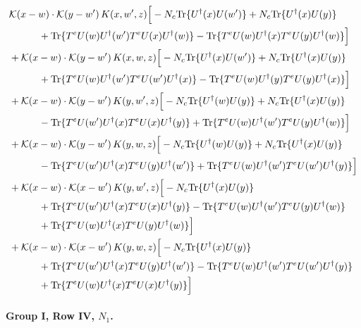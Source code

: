 \documentclass[10pt]{article}
\numberwithin{equation}{section}
\begin{document}
\begin{align}
&\mathcal K(x-w)\cdot\mathcal K(y-w')\,K(x,w',z)\Big[-N_c{\rm Tr}\{U^\dagger(x)U(w')\}+N_c{\rm Tr}\{U^\dagger(x)U(y)\}\notag\\
&\quad\quad\quad+{\rm Tr}\{T^eU(w)U^\dagger(w')T^eU(x)U^\dagger(w)\}-{\rm Tr}\{T^eU(w)U^\dagger(x)T^eU(y)U^\dagger(w)\}\Big]\notag\\
&+\mathcal K(x-w)\cdot\mathcal K(y-w')\,K(x,w,z)\Big[-N_c{\rm Tr}\{U^\dagger(x)U(w')\}+N_c{\rm Tr}\{U^\dagger(x)U(y)\}\notag\\
&\quad\quad\quad+{\rm Tr}\{T^eU(w)U^\dagger(w')T^eU(w')U^\dagger(x)\}-{\rm Tr}\{T^eU(w)U^\dagger(y)T^eU(y)U^\dagger(x)\}\Big]\notag\\
&+\mathcal K(x-w)\cdot\mathcal K(y-w')\,K(y,w',z)\Big[-N_c{\rm Tr}\{U^\dagger(w)U(y)\}+N_c{\rm Tr}\{U^\dagger(x)U(y)\}\notag\\
&\quad\quad\quad-{\rm Tr}\{T^eU(w')U^\dagger(x)T^eU(x)U^\dagger(y)\}+{\rm Tr}\{T^eU(w)U^\dagger(w')T^eU(y)U^\dagger(w)\}\Big]\notag\\
&+\mathcal K(x-w)\cdot\mathcal K(y-w')\,K(y,w,z)\Big[-N_c{\rm Tr}\{U^\dagger(w)U(y)\}+N_c{\rm Tr}\{U^\dagger(x)U(y)\}\notag\\
&\quad\quad\quad-{\rm Tr}\{T^eU(w')U^\dagger(x)T^eU(y)U^\dagger(w')\}+{\rm Tr}\{T^eU(w)U^\dagger(w')T^eU(w')U^\dagger(y)\}\Big]\notag\\
&+\mathcal K(x-w)\cdot\mathcal K(x-w')\,K(y,w',z)\Big[-N_c{\rm Tr}\{U^\dagger(x)U(y)\}\notag\\
&\quad\quad\quad+{\rm Tr}\{T^eU(w')U^\dagger(x)T^eU(x)U^\dagger(y)\}-{\rm Tr}\{T^eU(w)U^\dagger(w')T^eU(y)U^\dagger(w)\}\notag\\
&\quad\quad\quad+{\rm Tr}\{T^eU(w)U^\dagger(x)T^eU(y)U^\dagger(w)\}\Big]\notag\\
&+\mathcal K(x-w)\cdot\mathcal K(x-w')\,K(y,w,z)\Big[-N_c{\rm Tr}\{U^\dagger(x)U(y)\}\notag\\
&\quad\quad\quad+{\rm Tr}\{T^eU(w')U^\dagger(x)T^eU(y)U^\dagger(w')\}-{\rm Tr}\{T^eU(w)U^\dagger(w')T^eU(w')U^\dagger(y)\}\notag\\
&\quad\quad\quad+{\rm Tr}\{T^eU(w)U^\dagger(x)T^eU(x)U^\dagger(y)\}\Big]
\label{eq:list9}
\end{align}

\paragraph{Group I, Row IV, $N_1$.}
\end{document}
